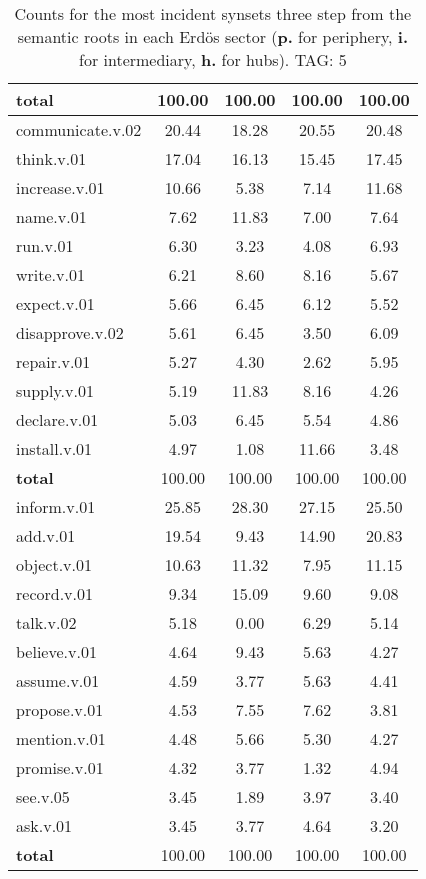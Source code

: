 \begin{table}[h!]
\begin{center}
\begin{tabular}{| l || c | c | c | c |}
{{\bf total}} & 100.00  & 100.00  & 100.00  & 100.00 \\\hline\hline\hline
communicate.v.02 & 20.44  & 18.28  & 20.55  & 20.48 \\\hline
think.v.01 & 17.04  & 16.13  & 15.45  & 17.45 \\\hline
increase.v.01 & 10.66  & 5.38  & 7.14  & 11.68 \\\hline
name.v.01 & 7.62  & 11.83  & 7.00  & 7.64 \\\hline
run.v.01 & 6.30  & 3.23  & 4.08  & 6.93 \\\hline
write.v.01 & 6.21  & 8.60  & 8.16  & 5.67 \\\hline
expect.v.01 & 5.66  & 6.45  & 6.12  & 5.52 \\\hline
disapprove.v.02 & 5.61  & 6.45  & 3.50  & 6.09 \\\hline
repair.v.01 & 5.27  & 4.30  & 2.62  & 5.95 \\\hline
supply.v.01 & 5.19  & 11.83  & 8.16  & 4.26 \\\hline
declare.v.01 & 5.03  & 6.45  & 5.54  & 4.86 \\\hline
install.v.01 & 4.97  & 1.08  & 11.66  & 3.48 \\\hline\hline
{{\bf total}} & 100.00  & 100.00  & 100.00  & 100.00 \\\hline\hline\hline
inform.v.01 & 25.85  & 28.30  & 27.15  & 25.50 \\\hline
add.v.01 & 19.54  & 9.43  & 14.90  & 20.83 \\\hline
object.v.01 & 10.63  & 11.32  & 7.95  & 11.15 \\\hline
record.v.01 & 9.34  & 15.09  & 9.60  & 9.08 \\\hline
talk.v.02 & 5.18  & 0.00  & 6.29  & 5.14 \\\hline
believe.v.01 & 4.64  & 9.43  & 5.63  & 4.27 \\\hline
assume.v.01 & 4.59  & 3.77  & 5.63  & 4.41 \\\hline
propose.v.01 & 4.53  & 7.55  & 7.62  & 3.81 \\\hline
mention.v.01 & 4.48  & 5.66  & 5.30  & 4.27 \\\hline
promise.v.01 & 4.32  & 3.77  & 1.32  & 4.94 \\\hline
see.v.05 & 3.45  & 1.89  & 3.97  & 3.40 \\\hline
ask.v.01 & 3.45  & 3.77  & 4.64  & 3.20 \\\hline\hline
{{\bf total}} & 100.00  & 100.00  & 100.00  & 100.00 \\\hline
\end{tabular}
\caption{Counts for the most incident synsets three step from the semantic roots in each Erd\"os sector ({\bf p.} for periphery, {\bf i.} for intermediary, {\bf h.} for hubs). TAG: 5}
\end{center}
\end{table}